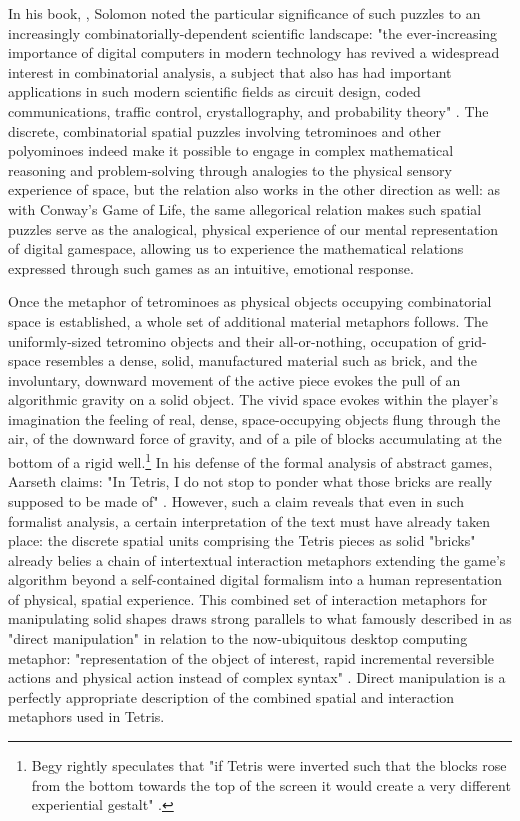 In his  book, , Solomon \citeauthor{Golomb1965} noted the particular significance of such puzzles to an increasingly combinatorially-dependent scientific landscape: "the ever-increasing importance of digital computers in modern technology has revived a widespread interest in combinatorial analysis, a subject that also has had important applications in such modern scientific fields as circuit design, coded communications, traffic control, crystallography, and probability theory" \autocite*[44]{Golomb1965}. The discrete, combinatorial spatial puzzles involving tetrominoes and other polyominoes indeed make it possible to engage in complex mathematical reasoning and problem-solving through analogies to the physical sensory experience of space, but the relation also works in the other direction as well: as with Conway's Game of Life, the same allegorical relation makes such spatial puzzles serve as the analogical, physical experience of our mental representation of digital gamespace, allowing us to experience the mathematical relations expressed through such games as an intuitive, emotional response.

Once the metaphor of tetrominoes as physical objects occupying combinatorial space is established, a whole set of additional material metaphors follows. The uniformly-sized tetromino objects and their all-or-nothing, occupation of grid-space resembles a dense, solid, manufactured material such as brick, and the involuntary, downward movement of the active piece evokes the pull of an algorithmic gravity on a solid object. The vivid space evokes within the player's imagination the feeling of real, dense, space-occupying objects flung through the air, of the downward force of gravity, and of a pile of blocks accumulating at the bottom of a rigid well.\footnote{
  Begy rightly speculates that "if Tetris were inverted such that the blocks rose from the bottom towards the top of the screen it would create a very different experiential gestalt" \autocite*[84]{Begy2010-zz}.
}
In his defense of the formal analysis of abstract games, Aarseth claims: "In Tetris, I do not stop to ponder what those bricks are really supposed to be made of" \autocite*[48]{Aarseth2004}. However, such a claim reveals that even in such formalist analysis, a certain interpretation of the text must have already taken place: the discrete spatial units comprising the Tetris pieces as solid "bricks" already belies a chain of intertextual interaction metaphors extending the game's algorithm beyond a self-contained digital formalism into a human representation of physical, spatial experience. This combined set of interaction metaphors for manipulating solid shapes draws strong parallels to what \citeauthor{Shneiderman82} famously described in \citeyear{Shneiderman82} as "direct manipulation" in relation to the now-ubiquitous desktop computing metaphor: "representation of the object of interest, rapid incremental reversible actions and physical action instead of complex syntax" \autocite[237]{Shneiderman82}. Direct manipulation is a perfectly appropriate description of the combined spatial and interaction metaphors used in Tetris.

